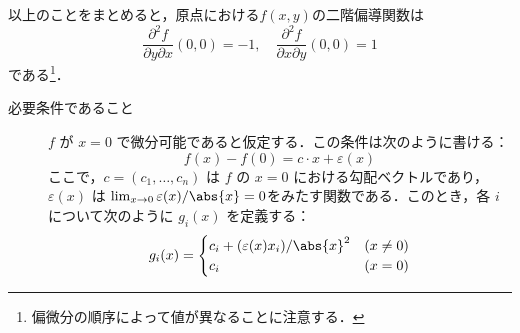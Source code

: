 \begin{tanswer}
以上のことをまとめると，原点における$f(x,y)$の二階偏導関数は
\[
\frac{\partial^2 f}{\partial y \partial x}(0,0) = -1  ,\quad    \frac{\partial^2 f}{\partial x \partial y}(0,0)=1
\]
である\footnote{偏微分の順序によって値が異なることに注意する．}．
\end{tanswer}






\begin{tproof}
  \begin{description}
    \item[必要条件であること]
          $ f $ が $ x=0 $ で微分可能であると仮定する．この条件は次のように書ける：
          \[
            f(x) - f(0) = c \cdot x + \varepsilon(x)
          \]
          ここで，$ c = (c_1, \ldots, c_n) $ は $ f $ の $ x=0 $ における勾配ベクトルであり，$ \varepsilon(x) $ は
          $\lim_{x \to 0} \varepsilon(x)/\abs{x} = 0$をみたす関数である．このとき，各 $ i $ について次のように $ g_i(x) $ を定義する：
          \[
            g_i(x) =
            \begin{cases}
              c_i + (\varepsilon(x) x_i)/\abs{x}^2 & (x \ne 0) \\
              c_i                                  & (x = 0)
            \end{cases}
          \]


\end{description}
\end{tproof}
